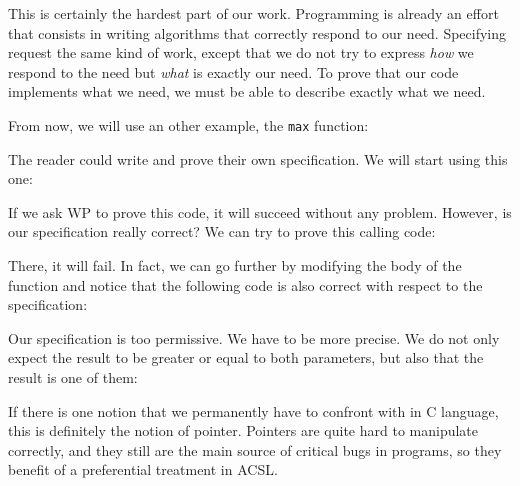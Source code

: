 


This is certainly the hardest part of our work. Programming is already
an effort that consists in writing algorithms that correctly respond to
our need. Specifying request the same kind of work, except that we do
not try to express \emph{how} we respond to the need but \emph{what} is
exactly our need. To prove that our code implements what we need, we
must be able to describe exactly what we need.

From now, we will use an other example, the \texttt{max} function:






The reader could write and prove their own specification. We will start
using this one:






If we ask WP to prove this code, it will succeed without any problem.
However, is our specification really correct? We can try to prove this
calling code:






There, it will fail. In fact, we can go further by modifying the body of
the  function and notice that the following code is also
correct with respect to the specification:






Our specification is too permissive. We have to be more precise. We do
not only expect the result to be greater or equal to both parameters,
but also that the result is one of them:








If there is one notion that we permanently have to confront with in C
language, this is definitely the notion of pointer. Pointers are quite
hard to manipulate correctly, and they still are the main source of
critical bugs in programs, so they benefit of a preferential treatment
in ACSL.

